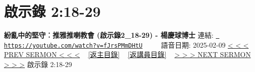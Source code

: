 \documentclass{book}
\begin{document}
\section{啟示錄 2:18-29}
\label{sec:fJrsPMmDHtU}
\textbf{紛亂中的堅守︰推雅推喇教會 (啟示錄2\_18-29) - 楊慶球博士}
\newline
\newline
連結: \href{https://youtube.com/watch?v=fJrsPMmDHtU}{\texttt{ https://youtube.com/watch?v=fJrsPMmDHtU}} ~~~~ 語音日期: 2025-02-09 
\newline
\newline
\hyperref[sec:l8BFPdIOADs]{< < < PREV SERMON < < <}
~
\hyperlink{toc}{[返主目錄]}
~
\hyperref[ch:preacher6]{[返講員目錄]}
~
\hyperref[sec:toZa1ewaUWE]{> > > NEXT SERMON > > >}
\newline
\newline
啟示錄 2:18-29
\newline
\end{document}
